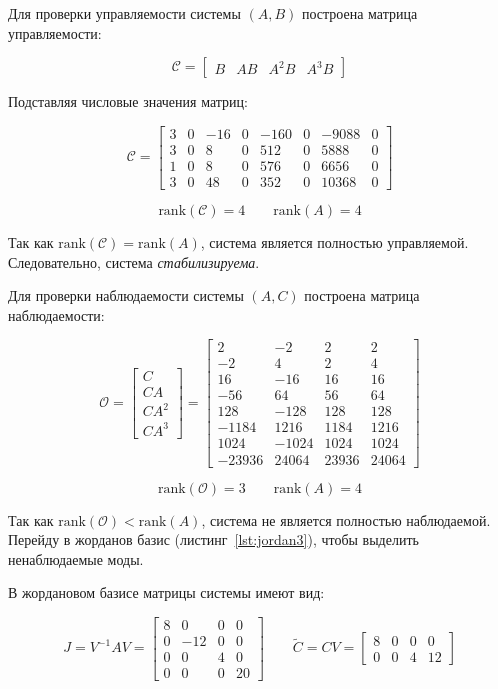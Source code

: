 \documentclass[a4paper,12pt]{article}
\begin{document}
Для проверки управляемости системы $(A, B)$ построена матрица управляемости:

\[
\mathcal{C} = \begin{bmatrix}
	B & AB & A^2B & A^3B
\end{bmatrix}
\]

Подставляя числовые значения матриц:

\[
\mathcal{C} = 
\begin{bmatrix}
	3 & 0 & -16 & 0 & -160 & 0 & -9088 & 0 \\
	3 & 0 & 8 & 0 & 512 & 0 & 5888 & 0 \\
	1 & 0 & 8 & 0 & 576 & 0 & 6656 & 0 \\
	3 & 0 & 48 & 0 & 352 & 0 & 10368 & 0
\end{bmatrix}
\]

\[
\text{rank}(\mathcal{C}) = 4 \qquad \text{rank}(A) = 4
\]

Так как $\text{rank}(\mathcal{C}) = \text{rank}(A)$, система является полностью управляемой. Следовательно, система \textit{стабилизируема}.

Для проверки наблюдаемости системы $(A, C)$ построена матрица наблюдаемости:

\[
\mathcal{O} = \begin{bmatrix}
	C \\ CA \\ CA^2 \\ CA^3
\end{bmatrix}
=
\begin{bmatrix}
	2 & -2 & 2 & 2 \\
	-2 & 4 & 2 & 4 \\
	16 & -16 & 16 & 16 \\
	-56 & 64 & 56 & 64 \\
	128 & -128 & 128 & 128 \\
	-1184 & 1216 & 1184 & 1216 \\
	1024 & -1024 & 1024 & 1024 \\
	-23936 & 24064 & 23936 & 24064
\end{bmatrix}
\]

\[
\text{rank}(\mathcal{O}) = 3 \qquad \text{rank}(A) = 4
\]

Так как $\text{rank}(\mathcal{O}) < \text{rank}(A)$, система не является полностью наблюдаемой. Перейду в жорданов базис (листинг~\ref{lst:jordan3}), чтобы выделить ненаблюдаемые моды.


В жордановом базисе матрицы системы имеют вид:

\[
J = V^{-1}AV = 
\begin{bmatrix}
	8 & 0 & 0 & 0 \\
	0 & -12 & 0 & 0 \\
	0 & 0 & 4 & 0 \\
	0 & 0 & 0 & 20
\end{bmatrix} \qquad
\tilde{C} = CV = 
\begin{bmatrix}
	8 & 0 & 0 & 0 \\
	0 & 0 & 4 & 12
\end{bmatrix}
\]
\end{document}
